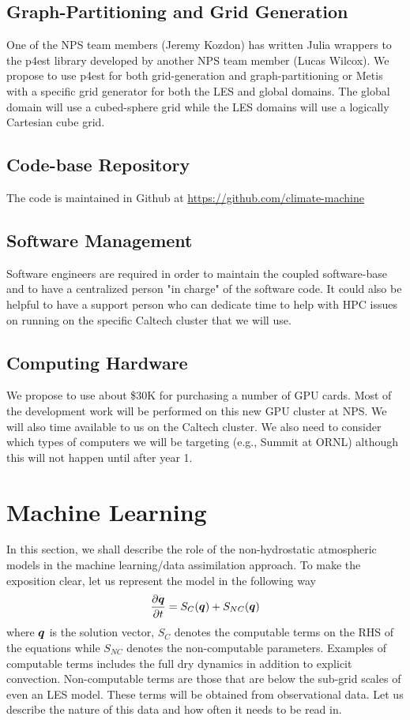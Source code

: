 \documentclass[12pt]{article}
\begin{document}
\subsection{Graph-Partitioning and Grid Generation}
One of the NPS team members (Jeremy Kozdon) has written Julia wrappers to the p4est library developed by another NPS team member (Lucas Wilcox).  We propose to use p4est for both grid-generation and graph-partitioning or Metis with a specific grid generator for both the LES and global domains. The global domain will use a cubed-sphere grid while the LES domains will use a logically Cartesian cube grid.

\subsection{Code-base Repository}
The code is maintained in Github at \url{https://github.com/climate-machine}

\subsection{Software Management}
Software engineers are required in order to maintain the coupled software-base and to have a centralized person "in charge" of the software code.  It could also be helpful to have a support person who can dedicate time to help with HPC issues on running on the specific Caltech cluster that we will use.  

\subsection{Computing Hardware}
We propose to use about \$30K for purchasing a number of GPU cards.  Most of the development work will be performed on this new GPU cluster at NPS.  We will also  time available to us on the Caltech cluster. We also need to consider which types of computers we will be targeting (e.g., Summit at ORNL) although this will not happen until after year 1.


\section{Machine Learning}
\label{sec:machine_learning}

In this section, we shall describe the role of the non-hydrostatic atmospheric models in the machine learning/data assimilation approach.  To make the exposition clear, let us represent the model in the following way
\[
\frac{\partial \mbox{\boldmath$q$\unboldmath}}{\partial t} = S_C(\mbox{\boldmath$q$\unboldmath}) + S_{NC}(\mbox{\boldmath$q$\unboldmath})
\]
where $\mbox{\boldmath$q$\unboldmath}$ is the solution vector, $S_C$ denotes the computable terms on the RHS of the equations while $S_{NC}$ denotes the non-computable parameters.  Examples of computable terms includes the full dry dynamics in addition to explicit convection.  Non-computable terms are those that are below the sub-grid scales of even an LES model.  These terms will be obtained from observational data.  Let us describe the nature of this data and how often it needs to be read in.
\end{document}
